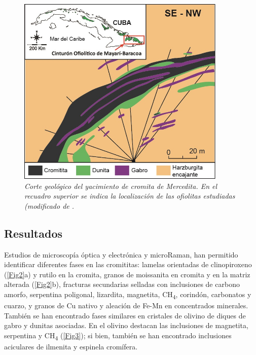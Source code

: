 \documentclass[a4paper,11pt]{article}
\begin{document}
	\begin{figure}[h]
		\centering
		\includegraphics[width=100mm]{Figura1.jpg}
		\caption{\sl Corte geológico del yacimiento de cromita de Mercedita. En el recuadro superior se indica la localización de las ofiolitas estudiadas (modificado de \cite{Pujol-Sola2018}.}
		\label{Fig1}
	\end{figure}
			
\begin{multicols}{2}
		\section{Resultados}
		Estudios de microscopía óptica y electrónica y microRaman, han permitido identificar diferentes fases en las cromititas: lamelas orientadas de clinopiroxeno (\ref{Fig2}a) y rutilo en la cromita, granos de moissanita en cromita y en la matriz alterada (\ref{Fig2}b), fracturas secundarias selladas con inclusiones de carbono amorfo, serpentina poligonal, lizardita, magnetita, CH\textsubscript{4}, corindón, carbonatos y cuarzo, y granos de Cu nativo y aleación de Fe-Mn en concentrados minerales. 
		También se han encontrado fases similares en cristales de olivino de diques de gabro y dunitas asociadas. En el olivino destacan las inclusiones de magnetita, serpentina y CH\textsubscript{4} (\ref{Fig3}); si bien, también se han encontrado inclusiones aciculares de ilmenita y espinela cromífera.
\end{multicols}
		
\end{document}
